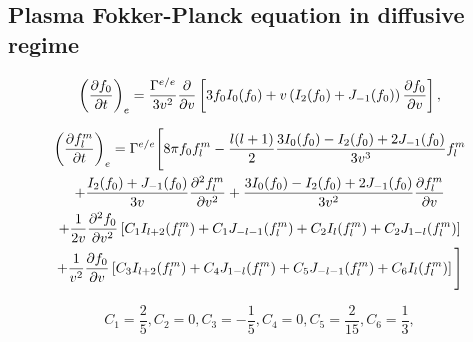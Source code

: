 \documentclass[preprint,12pt]{elsarticle}
\begin{document}
\subsection{Plasma Fokker-Planck equation in diffusive regime}
\begin{equation}
  \left(\frac{\partial{f_0}}{\partial{t}}\right)_{e} =
  \frac{\Gamma^{e/e}}{3v^2}\frac{\partial{}}{\partial{v}}\left[3 
  f_0 I_0(f_0) + v \left( I_2(f_0) + J_{-1}(f_0)\right)
  \frac{\partial{f_0}}{\partial{v}} \right] ,
  \nonumber
\end{equation}

\begin{multline}
  \left(\frac{\partial{f_l^m}}{\partial{t}}\right)_{e} = \Gamma^{e/e} \Bigg[
  8\pi f_0 f_l^m  
  - \frac{l(l+1)}{2}
  \frac{3 I_0(f_0) - I_2(f_0) + 2 J_{-1}(f_0)}{3v^3} f_l^m
  \\
  + \frac{I_2(f_0) + J_{-1}(f_0)}{3v}
  \frac{\partial^2 f_l^m}{\partial v^2} + 
  \frac{3 I_0(f_0) - I_2(f_0) + 2 J_{-1}(f_0)}{3v^2}
  \frac{\partial{f_l^m}}{\partial{v}} 
  \\
  + \frac{1}{2 v} \frac{\partial^2 f_0}{\partial v^2}
  \left[C_1 I_{l+2}(f_l^m) + C_1 J_{-l-1}(f_l^m) + C_2 I_l(f_l^m) 
  + C_2 J_{1-l}(f_l^m) \right]
  \\
  + \frac{1}{v^2} \frac{\partial{f_0}}{\partial{v}}
  \left[C_3 I_{l+2}(f_l^m) + C_4 J_{1-l}(f_l^m) + C_5 J_{-l-1}(f_l^m) 
  + C_6 I_l(f_l^m) \right] \Bigg]
\end{multline}

\begin{equation}
  C_1 = \frac{2}{5}, 
  C_2 = 0,
  C_3 = -\frac{1}{5},
  C_4 = 0,
  C_5 = \frac{2}{15}, 
  C_6 = \frac{1}{3}, 
  \nonumber
\end{equation}

\end{document}
